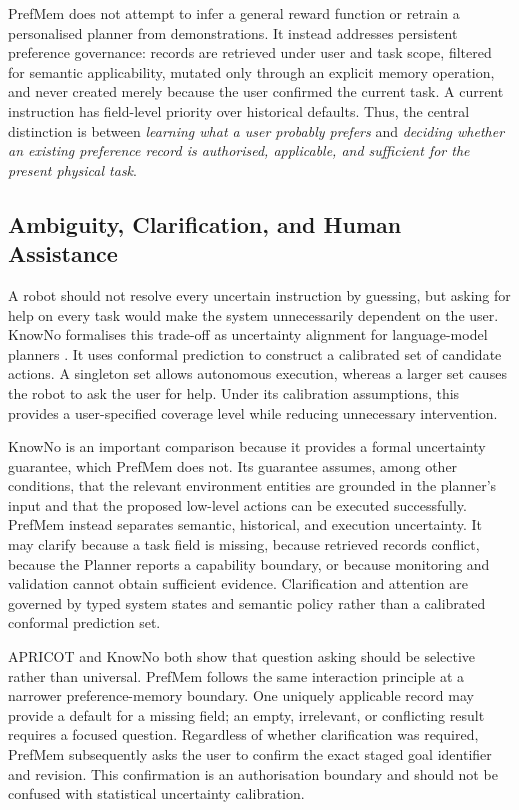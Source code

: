 \documentclass{article}
\begin{document}
PrefMem does not attempt to infer a general reward function or retrain a
personalised planner from demonstrations. It instead addresses persistent
preference governance: records are retrieved under user and task scope,
filtered for semantic applicability, mutated only through an explicit memory
operation, and never created merely because the user confirmed the current
task. A current instruction has field-level priority over historical defaults.
Thus, the central distinction is between \emph{learning what a user probably
prefers} and \emph{deciding whether an existing preference record is
authorised, applicable, and sufficient for the present physical task}.

\subsection{Ambiguity, Clarification, and Human Assistance}
\label{subsec:related-ambiguity}

A robot should not resolve every uncertain instruction by guessing, but asking
for help on every task would make the system unnecessarily dependent on the
user. KnowNo formalises this trade-off as uncertainty alignment for
language-model planners \parencite{ren2023knowno}. It uses conformal
prediction to construct a calibrated set of candidate actions. A singleton set
allows autonomous execution, whereas a larger set causes the robot to ask the
user for help. Under its calibration assumptions, this provides a
user-specified coverage level while reducing unnecessary intervention.

KnowNo is an important comparison because it provides a formal uncertainty
guarantee, which PrefMem does not. Its guarantee assumes, among other
conditions, that the relevant environment entities are grounded in the
planner's input and that the proposed low-level actions can be executed
successfully. PrefMem instead separates semantic, historical, and execution
uncertainty. It may clarify because a task field is missing, because retrieved
records conflict, because the Planner reports a capability boundary, or
because monitoring and validation cannot obtain sufficient evidence.
Clarification and attention are governed by typed system states and semantic
policy rather than a calibrated conformal prediction set.

APRICOT and KnowNo both show that question asking should be selective rather
than universal. PrefMem follows the same interaction principle at a narrower
preference-memory boundary. One uniquely applicable record may provide a
default for a missing field; an empty, irrelevant, or conflicting result
requires a focused question. Regardless of whether clarification was required,
PrefMem subsequently asks the user to confirm the exact staged goal identifier
and revision. This confirmation is an authorisation boundary and should not be
confused with statistical uncertainty calibration.
\end{document}
